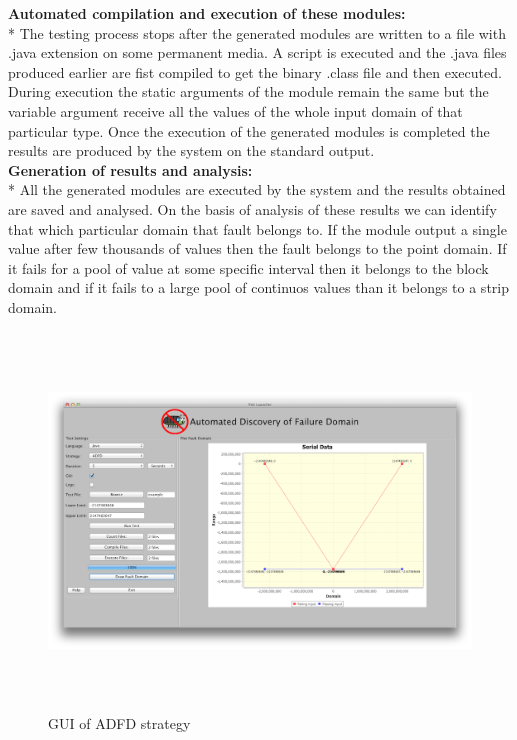 \documentclass{acm_proc_article-sp}
\begin{document}
\noindent \textbf{Automated compilation and execution of these modules:}\\*
\indent The testing process stops after the generated modules are written to a file with .java extension on some permanent media. A script is executed and the .java files produced earlier are fist compiled to get the binary .class file and then executed. During execution the static arguments of the module remain the same but the variable argument receive all the values of the whole input domain of that particular type. Once the execution of the generated modules is completed the results are produced by the system on the standard output.\\

\noindent \textbf{Generation of results and analysis:}\\*
\indent All the generated modules are executed by the system and the results obtained are saved and analysed. On the basis of analysis of these results we can identify that which particular domain that fault belongs to. If the module output a single value after few thousands of values then the fault belongs to the point domain. If it fails for a pool of value at some specific interval then it belongs to the block domain and if it fails to a large pool of continuos values than it belongs to a strip domain.\\

\begin{center}
\begin{figure}[htp]
\includegraphics[width=17cm,height=10cm]{adfdFrontEnd.png}
\caption{GUI of ADFD strategy}
\label{fig:patterns}
\end{figure}
\end{center}
\end{document}
